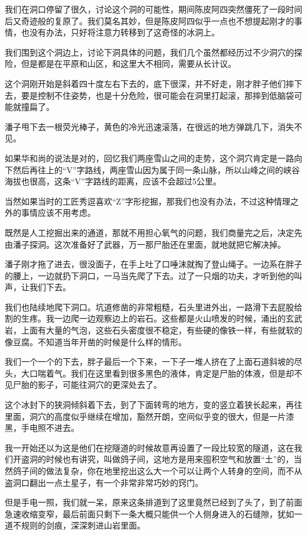 我们在洞口停留了很久，讨论这个洞的可能性，期间陈皮阿四突然僵死了一段时间后又奇迹般的复原了。我们莫名其妙，但是陈皮阿四似乎一点也不想提起刚才的事情，也没有办法，只好将注意力转移到了这奇怪的冰洞上。

我们围到这个洞边上，讨论下洞具体的问题，我们几个虽然都经历过不少洞穴的探险，但是都是在平原和山区，和这里大不相同，需要从长计议。

这个洞刚开始是斜着四十度左右下去的，底下很深，并不好走，刚才胖子他们摔下去，要是控制不住姿势，也是十分危险，很可能会在洞里打起滚，那摔到低脑袋可能就撞扁了。

潘子甩下去一根荧光棒子，黄色的冷光迅速滚落，在很远的地方弹跳几下，消失不见。

如果华和尚的说法是对的，回忆我们两座雪山之间的走势，这个洞穴肯定是一路向下然后再往上的“V”字路线，两座雪山因为属于同一条山脉，所以山峰之间的峡谷海拔也很高，这条“V”字路线的距离，应该不会超过5公里。

当然如果当时的工匠秀逗喜欢“Z”字形挖掘，那我们也没有办法，不过这种情理之外的事情应该不用考虑。

既然是人工挖掘出来的通道，那就不用担心氧气的问题，我们商量完之后，决定先由潘子探洞。这次准备好了武器，万一那尸胎还在里面，就地就把它解决掉。

潘子刚才拖了进去，很没面子，在手上吐了口唾沫就掏了登山绳子。一边系在胖子的腰上，一边就扔下洞口，一马当先爬了下去。过了一只烟的功夫，才听到他的叫声，让我们下去。

我们也陆续地爬下洞口。坑道修凿的非常粗糙，石头里进外出，一路滑下去屁股给割的生疼。我一边爬一边观察边上的岩石。这些都是火山喷发的时候，涌出的玄武岩，上面有大量的气泡，这些石头密度很不稳定，有些硬的像铁一样，有些就软的像豆腐。不知道当年开凿的时候是什么样的情形。

我们一个一个的下去，胖子最后一个下来，一下子一堆人挤在了上面石道斜坡的尽头，大口喘着气。我们在这里看到很多黑色的液体，肯定是尸胎的体液，但是却不见尸胎的影子，可能往洞穴的更深处去了。

这个冰封下的狭洞倾斜着下去，到了下面转弯的地方，变的竖立着狭长起来，再往里面，洞穴的高度似乎继续在增加，豁然开朗，空间似乎变的很大，但是一片漆黑，手电照不进去。

我一开始还以为这是他们在挖隧道的时候故意再设置了一段比较宽的隧道，这在我们开盗洞的时候也有讲究，叫做鸽子间，这地方是用来囤积空气和放置“土”的，当然鸽子间的做法复杂，你在地里挖出这么大一个可以让两个人转身的空间，而不从盗洞口翻出一点土星子，有一个非常非常巧妙的窍门。

但是手电一照，我们就一呆，原来这条排道到了这里竟然已经到了头了，到了前面急速收缩变窄，最后前面只剩下一条大概只能供一个人侧身进入的石缝隙，犹如一道不规则的剑痕，深深刺进山岩里面。

